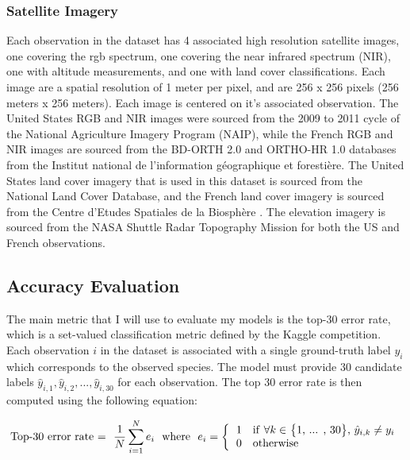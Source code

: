 \documentclass[12pt, oneside]{article}
\begin{document}
\begin{normalsize}
\subsubsection{Satellite Imagery}

Each observation in the dataset has 4 associated high resolution satellite images, one covering the rgb spectrum, one covering the near infrared spectrum (NIR), one with altitude measurements, and one with land cover classifications. Each image are a spatial resolution of 1 meter per pixel, and are 256 x 256 pixels (256 meters x 256 meters). Each image is centered on it's associated observation. The United States RGB and NIR images were sourced from the 2009 to 2011 cycle of the National Agriculture Imagery Program (NAIP), while the French RGB and NIR images are sourced from the BD-ORTH 2.0 and ORTHO-HR 1.0 databases from the Institut national de l'information géographique et forestière. The United States land cover imagery that is used in this dataset is sourced from the National Land Cover Database, and the French land cover imagery is sourced from the Centre d'Etudes Spatiales de la Biosphère \cite{homer2015completion}. The elevation imagery is sourced from the NASA Shuttle Radar Topography Mission for both the US and French observations.

\subsection{Accuracy Evaluation}

The main metric that I will use to evaluate my models is the top-30 error rate, which is a set-valued classification metric defined by the Kaggle competition. Each observation $i$ in the dataset is associated with a single ground-truth label $y_{i}$ which corresponds to the observed species. The model must provide 30 candidate labels $\hat{y}_{i,1},\hat{y}_{i,2}, ... , \hat{y}_{i,30}$ for each observation. The top 30 error rate is then computed using the following equation:

\[ 
\textnormal{Top-30 error rate = } \ \frac{1}{N} \sum\limits_{i=1}^N e_{i} \ \ \textnormal{where} \ \ e_{i} = 
\bigg\{
	  \begin{tabular}{l}
	  1 \ \ \textnormal{if} $\forall k \in$ \big\{1, ... , 30\big\}, $\hat{y}_{i,k} \neq y_{i}$ \\
	  0 \ \ \textnormal{otherwise} \\
	  \end{tabular}
\] 


\end{normalsize}
\end{document}
